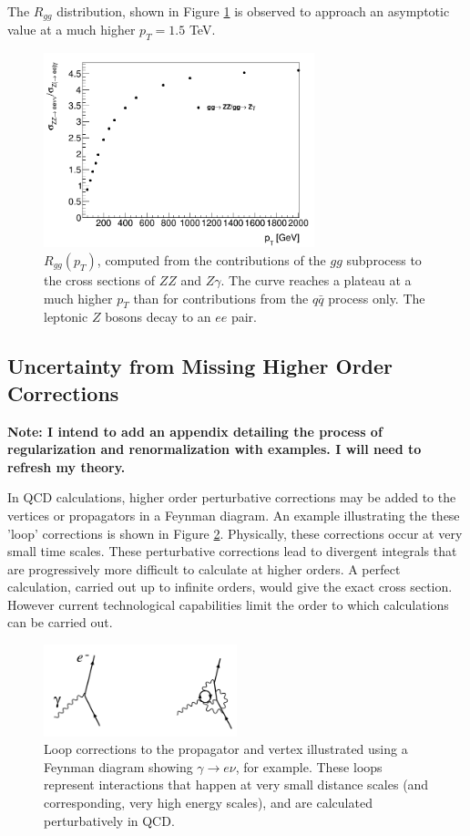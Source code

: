 \documentclass[11pt,a4paper,openright,twoside]{report}
\begin{document}
The $R_{gg}$ distribution, shown in Figure \ref{fig:R_ggonly} is observed to approach an asymptotic value at a much higher $p_T = 1.5$ TeV.

\begin{figure}[h]
\centering
\includegraphics[width=0.7\textwidth]{R_ggonly.png}
\caption{$R_{gg}(p_T)$, computed from the contributions of the $gg$ subprocess to the cross sections of $ZZ$ and $Z\gamma$. The curve reaches a plateau at a much higher $p_T$ than for contributions from the $q\bar{q}$ process only. The leptonic $Z$ bosons decay to an $ee$ pair.}
\label{fig:R_ggonly}
\end{figure}

\subsection{Uncertainty from Missing Higher Order Corrections}
\textbf{Note: I intend to add an appendix detailing the process of regularization and renormalization with examples. I will need to refresh my theory.}

In QCD calculations, higher order perturbative corrections may be added to the vertices or propagators in a Feynman diagram. An example illustrating the these 'loop' corrections is shown in Figure \ref{fig:loop_corr}. Physically, these corrections occur at very small time scales. These perturbative corrections lead to divergent integrals that are progressively more difficult to calculate at higher orders. A perfect calculation, carried out up to infinite orders, would give the exact cross section. However current technological capabilities limit the order to which calculations can be carried out.

\begin{figure}[H]
\centering
\includegraphics[width=0.5\textwidth]{renormalize_diagram.png}
\caption{Loop corrections to the propagator and vertex illustrated using a Feynman diagram showing $\gamma\to e\nu$, for example. These loops represent interactions that happen at very small distance scales (and corresponding, very high energy scales), and are calculated perturbatively in QCD.}
\label{fig:loop_corr}
\end{figure}
\end{document}
